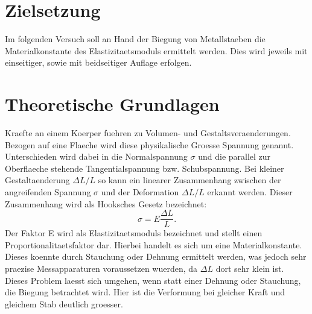 \section{Zielsetzung}
Im folgenden Versuch soll an Hand der Biegung von Metallstaeben die Materialkonstante des Elastizitaetsmoduls ermittelt werden. Dies wird jeweils mit einseitiger, sowie mit beidseitiger Auflage erfolgen.
\section{Theoretische Grundlagen}
Kraefte an einem Koerper fuehren zu Volumen- und Gestaltsveraenderungen. Bezogen auf eine Flaeche wird diese physikalische Groesse Spannung genannt. Unterschieden wird dabei in die Normalspannung $\sigma$ und die parallel zur Oberflaeche stehende Tangentialspannung bzw. Schubspannung. Bei kleiner Gestaltaenderung $\Delta L/L$ so kann ein linearer Zusammenhang zwischen der angreifenden Spannung $\sigma$ und der Deformation $\Delta L/L$ erkannt werden. Dieser Zusammenhang wird als Hooksches Gesetz bezeichnet:
\begin{equation}
    \sigma=E\frac{\Delta L}{L}.
\end{equation}
Der Faktor E wird als Elastizitaetsmoduls bezeichnet und stellt einen Proportionalitaetsfaktor dar. Hierbei handelt es sich um eine Materialkonstante. Dieses koennte durch Stauchung oder Dehnung ermittelt werden, was jedoch sehr praezise Messapparaturen voraussetzen wuerden, da $\Delta L$ dort sehr klein ist. Dieses Problem laesst sich umgehen, wenn statt einer Dehnung oder Stauchung, die Biegung betrachtet wird. Hier ist die Verformung bei gleicher Kraft und gleichem Stab deutlich groesser.
